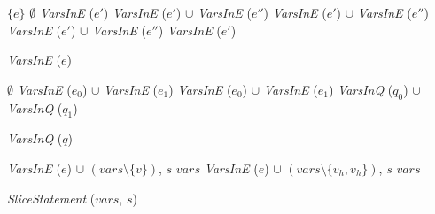 
\begin{algorithm}
  \begin{algorithmic}[1]
        \Return $\{ e \}$
      \EndCase
        \Return $\emptyset$
      \EndCase
        \Return \textit{VarsInE} ($e'$)
      \EndCase
        \Return \textit{VarsInE} ($e'$) $\cup$ \textit{VarsInE} ($e''$)
      \EndCase
        \Return \textit{VarsInE} ($e'$) $\cup$ \textit{VarsInE} ($e''$)
      \EndCase
        \Return \textit{VarsInE} ($e'$) $\cup$ \textit{VarsInE} ($e''$)
      \EndCase
        \Return \textit{VarsInE} ($e'$)
      \EndCase
    \EndMatch
  \end{algorithmic}
  \caption{\textit{VarsInE} ($e$)}
\end{algorithm}

\begin{algorithm}
\begin{algorithmic}[1]
    \Case{$\top$}
      $\emptyset$
    \EndCase
      \Return \textit{VarsInE} ($e_0$) $\cup$ \textit{VarsInE} ($e_1$)
    \EndCase
      \Return \textit{VarsInE} ($e_0$) $\cup$ \textit{VarsInE} ($e_1$)
    \EndCase
      \Return \textit{VarsInQ} ($q_0$) $\cup$ \textit{VarsInQ} ($q_1$)
    \EndCase
  \EndMatch
\end{algorithmic}
\caption{\textit{VarsInQ} ($q$)}
\end{algorithm}

\begin{algorithm}
  \begin{algorithmic}[1]
          {\Return \textit{VarsInE} ($e$) $\cup$ $(\mathit{vars} \setminus \{
            v \})$, $s$}
          {\Return $\mathit{vars}$}
      \EndCase
          {\Return \textit{VarsInE} ($e$) $\cup$ $(\mathit{vars} \setminus \{
            v_h, v_h \})$, $s$}
          {\Return $\mathit{vars}$}
      \EndCase
    \EndMatch
  \end{algorithmic}
  \caption{\textit{SliceStatement} ($\mathit{vars}$, $s$)}
\end{algorithm}

